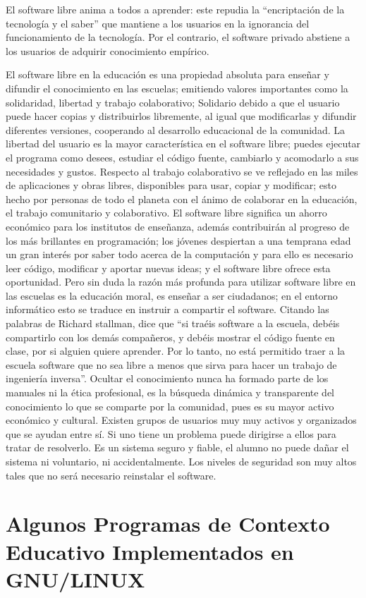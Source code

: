 El software libre anima a todos a aprender: este repudia la “encriptación de la tecnología y el saber” que mantiene a los usuarios en la ignorancia del funcionamiento de la tecnología. Por el contrario, el software privado abstiene a los usuarios de adquirir conocimiento empírico.

El software libre en la educación es una propiedad absoluta para enseñar y difundir el conocimiento en las escuelas; emitiendo valores importantes como la solidaridad, libertad y trabajo colaborativo; Solidario debido a que el usuario puede hacer copias y distribuirlos libremente, al igual que modificarlas y difundir diferentes versiones, cooperando al desarrollo educacional de la comunidad.
 La libertad del usuario es la mayor característica en el software libre; puedes ejecutar el programa como desees, estudiar el código fuente, cambiarlo y acomodarlo a sus necesidades y gustos. Respecto al trabajo colaborativo se ve reflejado en las miles de aplicaciones y obras libres, disponibles para usar, copiar y modificar; esto hecho por personas de todo el planeta con el ánimo de colaborar en la educación, el trabajo comunitario y colaborativo.
El software libre significa un ahorro económico para los institutos de enseñanza, además contribuirán al progreso de los más brillantes en programación; los jóvenes despiertan a una temprana edad un gran interés por saber todo acerca de la computación y para ello es necesario leer código, modificar y aportar nuevas ideas; y el software libre ofrece esta oportunidad.
Pero sin duda la razón más profunda para utilizar software libre en las escuelas es la educación moral, es enseñar  a ser ciudadanos; en  el entorno informático esto se traduce en instruir a compartir el software. Citando las palabras de Richard stallman, dice que “si traéis software a la escuela,  debéis compartirlo con los demás compañeros, y debéis mostrar el código fuente en clase, por si alguien quiere aprender. Por lo tanto, no está permitido traer a la escuela software que no sea libre a menos que sirva para hacer un trabajo de ingeniería inversa”.
Ocultar el conocimiento nunca ha formado parte de los manuales ni la ética profesional, es la búsqueda dinámica y transparente del conocimiento lo que se comparte por la comunidad, pues es su mayor activo económico y cultural. Existen grupos de usuarios muy muy activos y organizados que se ayudan entre sí. Si uno tiene un problema puede dirigirse a ellos para tratar de resolverlo.
Es un  sistema seguro y fiable, el alumno no puede dañar el sistema ni voluntario, ni accidentalmente. Los niveles de seguridad son muy altos tales que no será necesario reinstalar el software.

\section*{Algunos Programas de Contexto Educativo Implementados en GNU/LINUX}